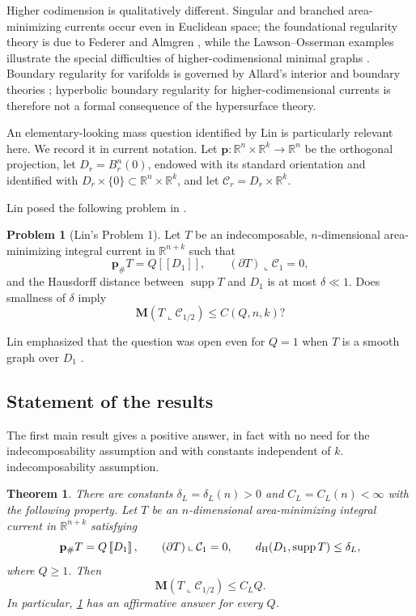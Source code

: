 \documentclass[11pt,reqno]{amsart}
\numberwithin{equation}{section}
\newtheorem{theorem}{Theorem}[section]
\theoremstyle{definition}
\newtheorem{problem}[problem]{Problem}
\theoremstyle{remark}
\newcommand{\R}{\mathbb R}
\newcommand{\Mass}{\mathbf M}
\newcommand{\supp}{\operatorname{supp}}
\newcommand{\restr}{\mathbin{\llcorner}}
\newcommand{\cur}[1]{\left[\!\left[#1\right]\!\right]}
\begin{document}
Higher codimension is qualitatively different.  Singular and branched
area-minimizing currents occur even in Euclidean space; the foundational
regularity theory is due to Federer and Almgren
\cite{Federer,Almgren}, while the Lawson--Osserman examples illustrate the
special difficulties of higher-codimensional minimal graphs
\cite{LawsonOsserman}.  Boundary regularity for varifolds is governed by
Allard's interior and boundary theories \cite{AllardFirst,AllardBoundary};
hyperbolic boundary regularity for higher-codimensional currents is therefore
not a formal consequence of the hypersurface theory.

An elementary-looking mass question identified by Lin is particularly
relevant here.  We record it in current notation.  Let
$\mathbf p:\R^n\times\R^k\to\R^n$ be the orthogonal projection, let
$D_r=B_r^n(0)$, endowed with its standard orientation and identified with
$D_r\times\{0\}\subset\R^n\times\R^k$, and let
$\mathcal C_r=D_r\times\R^k$.  



Lin posed the following problem in
\cite[Section~3, Problem~1]{LinAsymptotic}.

\begin{problem}[Lin's Problem 1]
\label{prob:Lin}
Let $T$ be an indecomposable, $n$-dimensional area-minimizing integral
current in $\R^{n+k}$ such that
\[
 \mathbf p_\#T=Q\cur{D_1},\qquad
 (\partial T)\restr\mathcal C_1=0,
\]
and the Hausdorff distance between $\supp T$ and $D_1$ is at
most $\delta\ll1$.  Does smallness of $\delta$ imply
\[
 \Mass(T\restr\mathcal C_{1/2})\le C(Q,n,k)?
\]
\end{problem}

Lin emphasized that the question was open even for $Q=1$ when $T$ is a
smooth graph over $D_1$ \cite[Section~3]{LinAsymptotic}.

\subsection{Statement of the results}

The first main result gives a positive answer, in fact with no need for the
indecomposability assumption and with constants independent of $k$.
indecomposability assumption.

\begin{theorem}
\label{thm:Lin-problem}
There are constants $\delta_L=\delta_L(n)>0$ and
$C_L=C_L(n)<\infty$ with the following property.  Let $T$ be an
$n$-dimensional area-minimizing integral current in $\R^{n+k}$ satisfying
\begin{equation}\label{eq:Lin-hypotheses}
 \mathbf p_\#T=Q\cur{D_1},
 \qquad
 (\partial T)\restr\mathcal C_1=0,
 \qquad
 d_{\rm H}(D_1,\supp T)\le\delta_L,
\end{equation}
where $Q\ge1$.  Then
\begin{equation}\label{eq:Lin-conclusion}
 \Mass(T\restr\mathcal C_{1/2})\le C_LQ.
\end{equation}
In particular, \cref{prob:Lin} has an affirmative answer for every $Q$.
\end{theorem}
\end{document}
